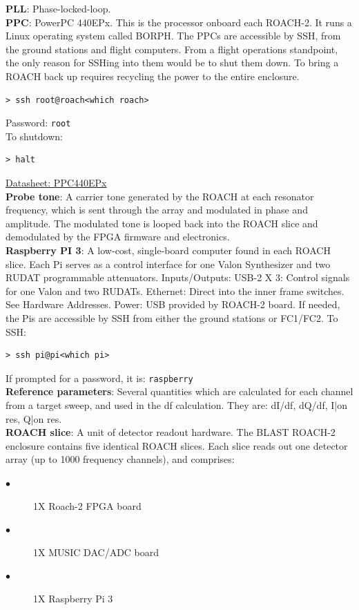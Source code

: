 \textbf{PLL}: Phase-locked-loop.\\
\textbf{PPC}: PowerPC 440EPx. This is the processor onboard each ROACH-2. It runs a Linux operating system called BORPH. The PPCs are accessible by SSH, from the ground stations and flight computers. From a flight operations standpoint, the only reason for SSHing into them would be to shut them down. To bring a ROACH back up requires recycling the power to the entire enclosure.
\begin{verbatim}
> ssh root@roach<which roach>
\end{verbatim}
Password: \texttt{root}\\
To shutdown:
\begin{verbatim}
> halt
\end{verbatim}
\href{http://c1170156.r56.cf3.rackcdn.com/UK_AMC_PPC440EPx-SUA400T_2DS.pdf}{Datasheet: PPC440EPx}\\
\textbf{Probe tone}: A carrier tone generated by the ROACH at each resonator frequency, which is sent through the array and modulated in phase and amplitude. The modulated tone is looped back into the ROACH slice and demodulated by the FPGA firmware and electronics.\\
\textbf{Raspberry PI 3}: A low-cost, single-board computer found in each ROACH slice. Each Pi serves as a control interface for one Valon Synthesizer and two RUDAT programmable attenuators.
Inputs/Outputs:
USB-2 X 3: Control signals for one Valon and two RUDATs.
Ethernet: Direct into the inner frame switches. See Hardware Addresses.
Power: USB provided by ROACH-2 board.
If needed, the Pis are accessible by SSH from either the ground stations or FC1/FC2. To SSH:\
\begin{verbatim}
> ssh pi@pi<which pi>
\end{verbatim}
If prompted for a password, it is: \texttt{raspberry}\\
\textbf{Reference parameters}: Several quantities which are calculated for each channel from a target sweep, and used in the df calculation. They are: dI/df, dQ/df, I|on res, Q|on res.\\
\textbf{ROACH slice}: A unit of detector readout hardware. The BLAST ROACH-2 enclosure contains five identical ROACH slices. Each slice reads out one detector array (up to 1000 frequency channels), and comprises:
\setlist[description]{leftmargin=\parindent,labelindent=\parindent,nosep}
\begin{description}
  \item[$\bullet$] 1X Roach-2 FPGA board
  \item[$\bullet$] 1X MUSIC DAC/ADC board
  \item[$\bullet$] 1X Raspberry Pi 3
\end{description}
